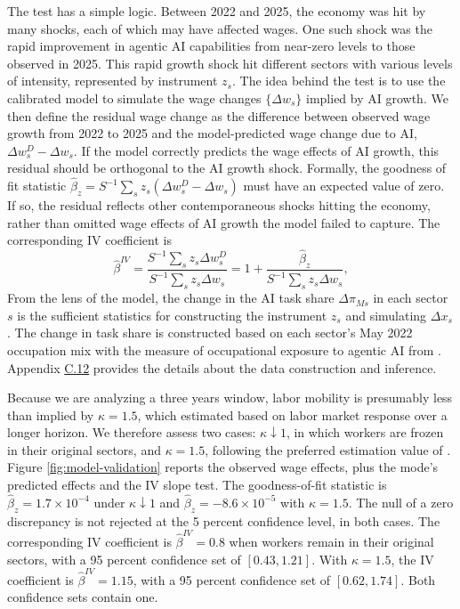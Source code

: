 \documentclass[11pt]{article}
\begin{document}
The test has a simple logic. Between 2022 and 2025, the economy was
hit by many shocks, each of which may have affected wages. One such
shock was the rapid improvement in agentic AI capabilities from near-zero
levels to those observed in 2025. This rapid growth shock hit different
sectors with various levels of intensity, represented by instrument
$z_{s}$. The idea behind the test is to use the calibrated model
to simulate the wage changes $\{\Delta w_{s}\}$ implied by AI growth.
We then define the residual wage change as the difference between
observed wage growth from 2022 to 2025 and the model-predicted wage
change due to AI, $\Delta w^{D}_{s}-\Delta w_{s}$. If the model correctly
predicts the wage effects of AI growth, this residual should be orthogonal
to the AI growth shock. Formally, the goodness of fit statistic $\widehat{\beta}_{z}=S^{-1}\sum_{s}z_{s}(\Delta w^{D}_{s}-\Delta w_{s})$
must have an expected value of zero. If so, the residual reflects
other contemporaneous shocks hitting the economy, rather than omitted
wage effects of AI growth the model failed to capture. The corresponding
IV coefficient is
\[
\widehat{\beta}^{IV}=\frac{S^{-1}\sum_{s}z_{s}\Delta w^{D}_{s}}{S^{-1}\sum_{s}z_{s}\Delta w_{s}}=1+\frac{\widehat{\beta}_{z}}{S^{-1}\sum_{s}z_{s}\Delta w_{s}},
\]
From the lens of the model, the change in the AI task share $\Delta\pi_{Ms}$
in each sector $s$ is the sufficient statistics for constructing
the instrument $z_{s}$ and simulating $\Delta x_{s}$. The change
in task share is constructed based on each sector's May 2022 occupation
mix with the measure of occupational exposure to agentic AI from \citet{emmr2024}.
Appendix \href{https://ahmadlp.github.io/Lashkaripour_AI_Displacement_Online_Appendix.pdf\#page=93}{C.12} provides the details about the
data construction and inference.

Because we are analyzing a three years window, labor mobility is presumably
less than implied by $\kappa=1.5$, which estimated based on
labor market response over a longer horizon. We therefore assess two
cases: $\kappa\downarrow1$, in which workers are frozen in their
original sectors, and $\kappa=1.5$, following the preferred
estimation value of \citet{gry2023}. Figure \ref{fig:model-validation}
reports the observed wage effects, plus the mode's predicted effects
and the IV slope test. The goodness-of-fit statistic is $\widehat{\beta}_{z}=1.7\times 10^{-4}$
under $\kappa\downarrow1$ and $\widehat{\beta}_{z}=-8.6\times 10^{-5}$
with $\kappa=1.5$. The null of a zero discrepancy is not rejected
at the 5 percent confidence level, in both cases. The corresponding
IV coefficient is $\widehat{\beta}^{IV}=0.8$
when workers remain in their original sectors, with a 95 percent confidence
set of $[0.43,1.21]$.
With $\kappa=1.5$, the IV coefficient is $\widehat{\beta}^{IV}=1.15$,
with a 95 percent confidence set of $[0.62,1.74]$.
Both confidence sets contain one.
\end{document}
